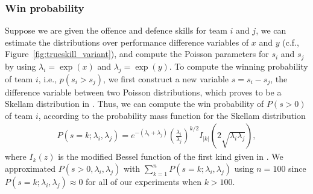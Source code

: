 

\subsubsection{Win probability}
Suppose we
are given the offence and defence skills for team $i$ and $j$, we can
estimate the distributions over performance difference variables of
$x$ and $y$ (c.f., Figure~\ref{fig:trueskill_variant}), and compute
the Poisson parameters for $s_i$ and $s_j$ by using $\lambda_i =
\exp(x)$ and $\lambda_j = \exp(y)$. To compute the winning probability
of team $i$, i.e., $p(s_i>s_j)$, we first construct a new variable $s
= s_i-s_j$, the difference variable between two Poisson distributions,
which proves to be a Skellam distribution in
\cite{Skellam46TheFrequencyDistribution}. Thus, we can compute the win
probability of $P(s>0)$ of team $i$, according to the probability mass
function for the Skellam distribution
\begin{align*}
     P(s=k; \lambda_i, \lambda_j) =e^{-(\lambda_i+\lambda_j)}\left(\frac{\lambda_i}{\lambda_j}\right)^{k/2}I_{|k|}\left(2\sqrt{\lambda_i\lambda_j}\right),
\end{align*}
where $I_{k}(z)$ is the modified Bessel function of the first kind given in \cite{Abramowitz74HandbookOfMathematical}.
We approximated $P(s>0,\lambda_i, \lambda_j)$ with
$\sum_{k=1}^{n} P(s=k; \lambda_i, \lambda_j)$ using $n=100$ since
$P(s=k; \lambda_i, \lambda_j) \approx 0$ for all of our experiments
when $k>100$.

